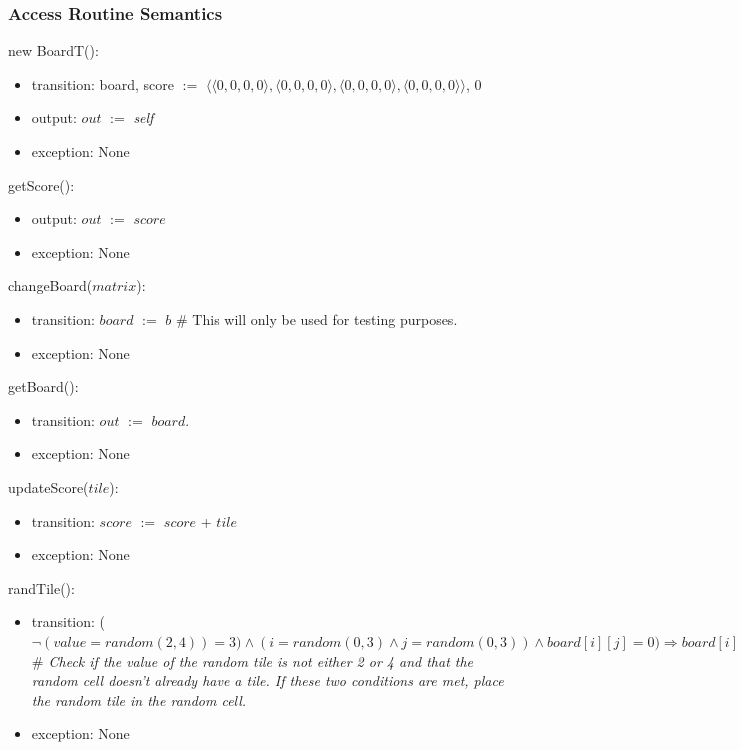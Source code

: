 \documentclass[12pt]{article}
\begin{document}
\subsubsection* {Access Routine Semantics}

\noindent new BoardT():
\begin{itemize}
  \item transition: board, score $:=$ $\langle \langle 0,0,0,0 \rangle,\langle 0,0,0,0 \rangle, \langle 0,0,0,0\rangle, \langle 0,0,0,0 \rangle \rangle$,  0\newline
  \item output: $out$ $:=$ \textit{self}
  \item exception: None
\end{itemize}

\noindent getScore():
\begin{itemize}
\item output: $out$ $:=$ $score$ 
\item exception: None
\end{itemize}

\noindent changeBoard($matrix$):
\begin{itemize}
\item transition: $board$ $:=$ $b$ $\#$ This will only be used for testing purposes.
\item exception: None
\end{itemize}

\noindent getBoard():
\begin{itemize}
\item transition: $out$ $:=$ $board$.
\item exception: None
\end{itemize}

\noindent updateScore($tile$):
\begin{itemize}
\item transition: $score$ $:=$ $score$ + $tile$
\item exception: None
\end{itemize}

\noindent randTile():
\begin{itemize}
\item transition: ($\lnot (value = random (2,4)) = 3) \land ( i = random(0,3) \land j = random(0,3)) \land board[i][j] = 0)   \Rightarrow board[i][j] := value$ \newline \textit{$\#$ Check if the value of the random tile is not either 2 or 4 and that the random cell doesn't already have a tile. If these two conditions are met, place the random tile in the random cell.}\\
\item exception: None\newline
\end{itemize}
\end{document}
